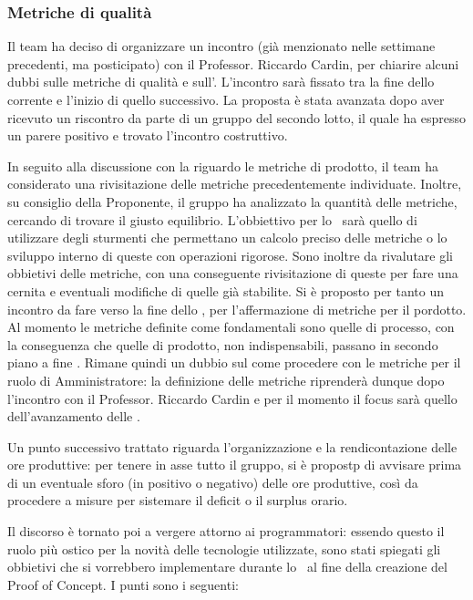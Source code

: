 \subsubsection{Metriche di qualità}
\par Il team ha deciso di organizzare un incontro (già menzionato nelle settimane precedenti, ma posticipato) con il Professor. Riccardo Cardin, per chiarire alcuni dubbi sulle metriche di qualità e sull'\AdR. L'incontro sarà fissato tra la fine dello  corrente e l'inizio di quello successivo.
La proposta è stata avanzata dopo aver ricevuto un riscontro da parte di un gruppo del secondo lotto, il quale ha espresso un parere positivo e trovato l'incontro costruttivo.
\par In seguito alla discussione con la  riguardo le metriche di prodotto, il team ha considerato una rivisitazione delle metriche precedentemente individuate. Inoltre, su consiglio della Proponente, il gruppo ha analizzato la quantità delle metriche, cercando di trovare il giusto equilibrio.
L'obbiettivo per lo \ sarà quello di utilizzare degli sturmenti che permettano un calcolo preciso delle metriche o lo sviluppo interno di queste con operazioni rigorose. 
Sono inoltre da rivalutare gli obbietivi delle metriche, con una conseguente rivisitazione di queste per fare una cernita e eventuali modifiche di quelle già stabilite.
Si è proposto per tanto un incontro da fare verso la fine dello , per l'affermazione di metriche per il pordotto.
Al momento le metriche definite come fondamentali sono quelle di processo, con la conseguenza che quelle di prodotto, non indispensabili, passano in secondo piano a fine .
Rimane quindi un dubbio sul come procedere con le metriche per il ruolo di Amministratore: la definizione delle metriche riprenderà dunque dopo l'incontro con il Professor. Riccardo Cardin e per il momento il focus sarà quello dell'avanzamento delle \NdP.
\par Un punto successivo trattato riguarda l'organizzazione e la rendicontazione delle ore produttive: per tenere in asse tutto il gruppo, si è propostp di avvisare prima di un eventuale sforo (in positivo o negativo) delle ore produttive, così da procedere a misure per sistemare il deficit o il surplus orario.
\par Il discorso è tornato poi a vergere attorno ai programmatori: essendo questo il ruolo più ostico per la novità delle tecnologie utilizzate, sono stati spiegati gli obbietivi che si vorrebbero implementare durante lo \ al fine della creazione del Proof of Concept. I punti sono i seguenti:
